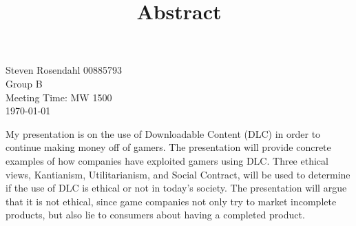 \documentclass{paper}
\date{}
\author{}
\title{Abstract}
\renewcommand{\standardhead}{%
	\noindent Group B\\
	\noindent Meeting Time: MW 1500\\
	\noindent \today
}
\renewcommand{\finalh}{%
	\begin{flushright}
		\noindent Steven Rosendahl 00885793\\
		\standardhead{}
	\end{flushright}
}
\renewcommand{\inlinetitle}{\vspace{-1.5cm}{\let\newpage\relax\maketitle}\vspace{-1.5cm}}
\begin{document}
\finalh{}
\inlinetitle{}

My presentation is on the use of Downloadable Content (DLC) in order to continue making money off of gamers.
The presentation will provide concrete examples of how companies have exploited gamers using DLC. Three
ethical views, Kantianism, Utilitarianism, and Social Contract, will be used to determine if the use of
DLC is ethical or not in today's society. The presentation will argue that it is not ethical, since game
companies not only try to market incomplete products, but also lie to consumers about having a completed
product.
\nocite{*}

\printbibliography
\end{document}
